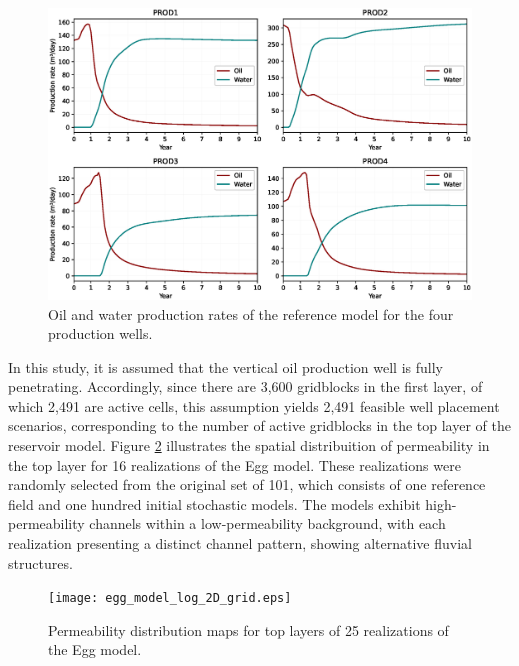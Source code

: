 \documentclass[pdflatex,sn-basic]{sn-jnl}%
\theoremstyle{thmstyleone}%
\theoremstyle{thmstyletwo}%
\theoremstyle{thmstylethree}%
\begin{document}
\begin{figure}[H]
\centering
\begin{minipage}{0.95\textwidth}
  \includegraphics[width=\textwidth]{production_plot.eps}
  \caption{Oil and water production rates of the reference model for the four production wells.}
  \label{fig4}
\end{minipage}
\end{figure}

In this study, it is assumed that the vertical oil production well is fully penetrating. Accordingly, since there are 3,600 gridblocks in the first layer, of which 2,491 are active cells, this assumption yields 2,491 feasible well placement scenarios, corresponding to the number of active gridblocks in the top layer of the reservoir model. Figure \ref{fig5} illustrates the spatial distribuition of permeability in the top layer for 16 realizations of the Egg model. These realizations were randomly selected from the original set of 101, which consists of one reference field and one hundred initial stochastic models. The models exhibit high-permeability channels within a low-permeability background, with each realization presenting a distinct channel pattern, showing alternative fluvial structures.

\begin{figure}[H]
\centering
\begin{minipage}{0.95\textwidth}
  \texttt{[image: egg\_model\_log\_2D\_grid.eps]}
  \caption{Permeability distribution maps for top layers of 25 realizations of the Egg model.}
  \label{fig5}
\end{minipage}
\end{figure}
\end{document}
